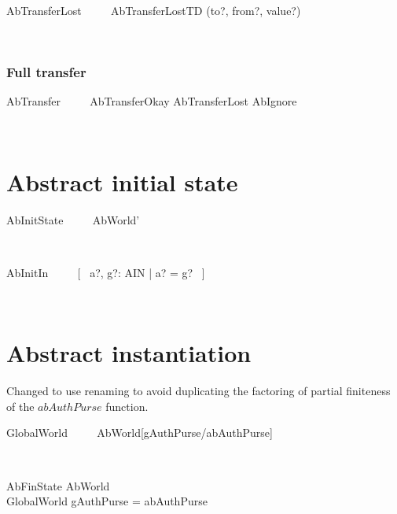 \begin{LSDef}
\begin{zed}
   AbTransferLost ~~~~ AbTransferLostTD \hide (to?, from?, value?)
\end{zed}~\end{LSDef}

\subsubsection{Full transfer}

\begin{LSDef}
\begin{zed}
   AbTransfer ~~~~ AbTransferOkay \lor AbTransferLost \lor AbIgnore
\end{zed}~\end{LSDef}

\section{Abstract initial state}

\begin{LSDef}
\begin{zed}
  AbInitState ~~~~ AbWorld'
\end{zed}~\end{LSDef}

\begin{LSDef}
\begin{zed}
  AbInitIn ~~~~ [~ a?, g?: AIN | a? = g? ~]
\end{zed}~\end{LSDef}

\section{Abstract instantiation}

Changed to use renaming to avoid duplicating the
factoring of partial finiteness of the $abAuthPurse$
function.
%
\begin{LSDef}
\begin{zed}
   GlobalWorld ~~~~ AbWorld[gAuthPurse/abAuthPurse]
\end{zed}~\end{LSDef}

\begin{LSDef}
\begin{schema}{AbFinState}
   AbWorld \\
   GlobalWorld
\where
   gAuthPurse = abAuthPurse
\end{schema}~\end{LSDef}

